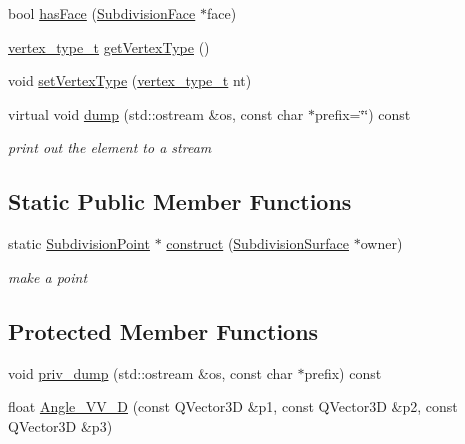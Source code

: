 \begin{DoxyCompactItemize}
bool \hyperlink{classShipCAD_1_1SubdivisionPoint_a720d2fc986ba8a365e8722e0e3e28be5}{has\-Face} (\hyperlink{classShipCAD_1_1SubdivisionFace}{Subdivision\-Face} $\ast$face)
\item 
\hyperlink{namespaceShipCAD_a03171cc921c53a568b778f5131a60deb}{vertex\-\_\-type\-\_\-t} \hyperlink{classShipCAD_1_1SubdivisionPoint_a3ccd55795bf99f25b1ad8f937de9670a}{get\-Vertex\-Type} ()
\item 
void \hyperlink{classShipCAD_1_1SubdivisionPoint_a614259dfa2470bbbd7b8cc73039ad501}{set\-Vertex\-Type} (\hyperlink{namespaceShipCAD_a03171cc921c53a568b778f5131a60deb}{vertex\-\_\-type\-\_\-t} nt)
\item 
virtual void \hyperlink{classShipCAD_1_1SubdivisionPoint_aed72cf5e8dc67e980010d195f3a376a3}{dump} (std\-::ostream \&os, const char $\ast$prefix=\char`\"{}\char`\"{}) const 
\begin{DoxyCompactList}\small\item\em print out the element to a stream \end{DoxyCompactList}\end{DoxyCompactItemize}
\subsection*{Static Public Member Functions}
\begin{DoxyCompactItemize}
\item 
static \hyperlink{classShipCAD_1_1SubdivisionPoint}{Subdivision\-Point} $\ast$ \hyperlink{classShipCAD_1_1SubdivisionPoint_a8e907cca747b0483374d4fdde8eb4ad1}{construct} (\hyperlink{classShipCAD_1_1SubdivisionSurface}{Subdivision\-Surface} $\ast$owner)
\begin{DoxyCompactList}\small\item\em make a point \end{DoxyCompactList}\end{DoxyCompactItemize}
\subsection*{Protected Member Functions}
\begin{DoxyCompactItemize}
\item 
void \hyperlink{classShipCAD_1_1SubdivisionPoint_aa2d85a086268f335eefeaef0b48a96a1}{priv\-\_\-dump} (std\-::ostream \&os, const char $\ast$prefix) const 
\item 
float \hyperlink{classShipCAD_1_1SubdivisionPoint_a72061d495903d8265f33bada30a0c416}{Angle\-\_\-\-V\-V\-\_\-D} (const Q\-Vector3\-D \&p1, const Q\-Vector3\-D \&p2, const Q\-Vector3\-D \&p3)
\end{DoxyCompactItemize}
